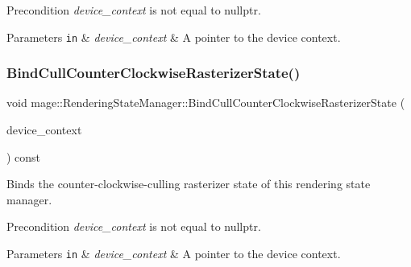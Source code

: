 \begin{DoxyPrecond}{Precondition}
{\itshape device\+\_\+context} is not equal to {\ttfamily nullptr}. 
\end{DoxyPrecond}

\begin{DoxyParams}[1]{Parameters}
\mbox{\tt in}  & {\em device\+\_\+context} & A pointer to the device context. \\
\hline
\end{DoxyParams}
\hypertarget{classmage_1_1_rendering_state_manager_a54d2bc53eaeb2ac0a01a2b9e26890f77}{}\label{classmage_1_1_rendering_state_manager_a54d2bc53eaeb2ac0a01a2b9e26890f77} 
\subsubsection{\texorpdfstring{Bind\+Cull\+Counter\+Clockwise\+Rasterizer\+State()}{BindCullCounterClockwiseRasterizerState()}}
{\footnotesize\ttfamily void mage\+::\+Rendering\+State\+Manager\+::\+Bind\+Cull\+Counter\+Clockwise\+Rasterizer\+State (\begin{DoxyParamCaption}\item[{I\+D3\+D11\+Device\+Context4 $\ast$}]{device\+\_\+context }\end{DoxyParamCaption}) const\hspace{0.3cm}{\ttfamily [noexcept]}}

Binds the counter-\/clockwise-\/culling rasterizer state of this rendering state manager.

\begin{DoxyPrecond}{Precondition}
{\itshape device\+\_\+context} is not equal to {\ttfamily nullptr}. 
\end{DoxyPrecond}

\begin{DoxyParams}[1]{Parameters}
\mbox{\tt in}  & {\em device\+\_\+context} & A pointer to the device context. \\
\hline
\end{DoxyParams}
\hypertarget{classmage_1_1_rendering_state_manager_a9dfef6d7fb2cea65fc362e4768088ed0}{}\label{classmage_1_1_rendering_state_manager_a9dfef6d7fb2cea65fc362e4768088ed0} 
